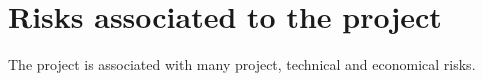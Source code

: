 \chapter{Risks associated to the project}
\label{chap:risks}

The project is associated with many project, technical and economical risks.





